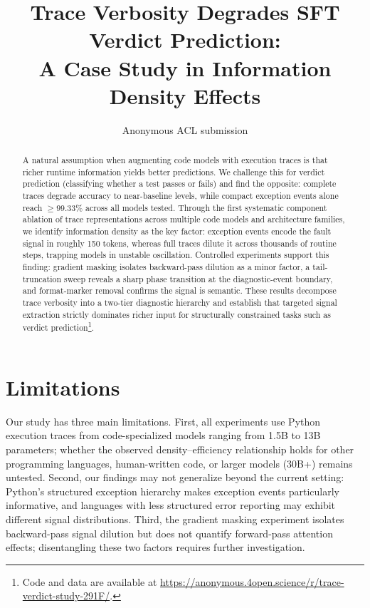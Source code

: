 \documentclass[11pt]{article}
\title{Trace Verbosity Degrades SFT Verdict Prediction:\\ A Case Study in Information Density Effects}
\author{Anonymous ACL submission}
\begin{document}
\maketitle

\begin{abstract}
A natural assumption when augmenting code models with execution traces is that richer runtime information yields better predictions.
We challenge this for verdict prediction (classifying whether a test passes or fails) and find the opposite: complete traces degrade accuracy to near-baseline levels, while compact exception events alone reach ${\geq}$99.33\% across all models tested.
Through the first systematic component ablation of trace representations across multiple code models and architecture families, we identify information density as the key factor: exception events encode the fault signal in roughly 150 tokens, whereas full traces dilute it across thousands of routine steps, trapping models in unstable oscillation.
Controlled experiments support this finding: gradient masking isolates backward-pass dilution as a minor factor, a tail-truncation sweep reveals a sharp phase transition at the diagnostic-event boundary, and format-marker removal confirms the signal is semantic.
These results decompose trace verbosity into a two-tier diagnostic hierarchy and establish that targeted signal extraction strictly dominates richer input for structurally constrained tasks such as verdict prediction\footnote{Code and data are available at \url{https://anonymous.4open.science/r/trace-verdict-study-291F/}.}.
\end{abstract}








\section*{Limitations}

Our study has three main limitations.
First, all experiments use Python execution traces from code-specialized models ranging from 1.5B to 13B parameters; whether the observed density--efficiency relationship holds for other programming languages, human-written code, or larger models (30B+) remains untested.
Second, our findings may not generalize beyond the current setting: Python's structured exception hierarchy makes exception events particularly informative, and languages with less structured error reporting may exhibit different signal distributions.
Third, the gradient masking experiment isolates backward-pass signal dilution but does not quantify forward-pass attention effects; disentangling these two factors requires further investigation.



\clearpage
\appendix
\makeatletter
\renewcommand{\verbatim@font}{\normalfont\rmfamily\small}
\makeatother

\end{document}
